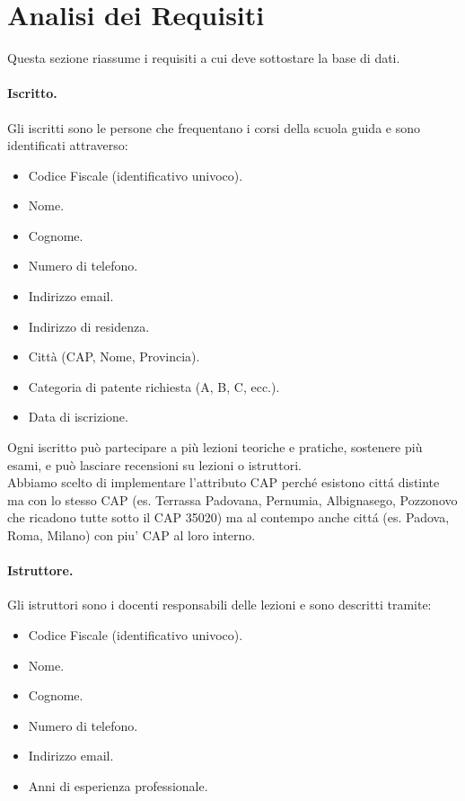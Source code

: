 \documentclass[10pt,twoside]{article}
\begin{document}
\section{Analisi dei Requisiti}{
    \label{sec:analisiRequisiti}
    Questa sezione riassume i requisiti a cui deve sottostare la base di dati.

    \paragraph{Iscritto.}
    Gli iscritti sono le persone che frequentano i corsi della scuola guida e sono identificati attraverso:

    \begin{itemize}
        \item Codice Fiscale (identificativo univoco).
        \item Nome.
        \item Cognome.
        \item Numero di telefono.
        \item Indirizzo email.
        \item Indirizzo di residenza.
        \item Città (CAP, Nome, Provincia). 
        \item Categoria di patente richiesta (A, B, C, ecc.).
        \item Data di iscrizione.
    \end{itemize}
    
    Ogni iscritto può partecipare a più lezioni teoriche e pratiche, sostenere più esami, e può lasciare recensioni su lezioni o istruttori. \\
    Abbiamo scelto di implementare l'attributo CAP perché esistono cittá distinte ma con lo stesso CAP (es. Terrassa Padovana, Pernumia, Albignasego, Pozzonovo che ricadono tutte sotto il CAP 35020) ma al contempo anche cittá (es. Padova, Roma, Milano) con piu' CAP al loro interno.
    

    \paragraph{Istruttore.}
    Gli istruttori sono i docenti responsabili delle lezioni e sono descritti tramite:
    
    \begin{itemize}
        \item Codice Fiscale (identificativo univoco).
        \item Nome.
        \item Cognome.
        \item Numero di telefono.
        \item Indirizzo email.
        \item Anni di esperienza professionale.
    \end{itemize}

}
\end{document}
